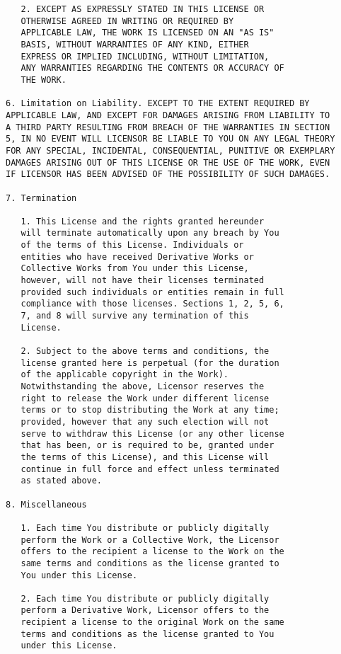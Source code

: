 \begin{verbatim}
   2. EXCEPT AS EXPRESSLY STATED IN THIS LICENSE OR
   OTHERWISE AGREED IN WRITING OR REQUIRED BY
   APPLICABLE LAW, THE WORK IS LICENSED ON AN "AS IS"
   BASIS, WITHOUT WARRANTIES OF ANY KIND, EITHER
   EXPRESS OR IMPLIED INCLUDING, WITHOUT LIMITATION,
   ANY WARRANTIES REGARDING THE CONTENTS OR ACCURACY OF
   THE WORK.

6. Limitation on Liability. EXCEPT TO THE EXTENT REQUIRED BY
APPLICABLE LAW, AND EXCEPT FOR DAMAGES ARISING FROM LIABILITY TO
A THIRD PARTY RESULTING FROM BREACH OF THE WARRANTIES IN SECTION
5, IN NO EVENT WILL LICENSOR BE LIABLE TO YOU ON ANY LEGAL THEORY
FOR ANY SPECIAL, INCIDENTAL, CONSEQUENTIAL, PUNITIVE OR EXEMPLARY
DAMAGES ARISING OUT OF THIS LICENSE OR THE USE OF THE WORK, EVEN
IF LICENSOR HAS BEEN ADVISED OF THE POSSIBILITY OF SUCH DAMAGES.

7. Termination

   1. This License and the rights granted hereunder
   will terminate automatically upon any breach by You
   of the terms of this License. Individuals or
   entities who have received Derivative Works or
   Collective Works from You under this License,
   however, will not have their licenses terminated
   provided such individuals or entities remain in full
   compliance with those licenses. Sections 1, 2, 5, 6,
   7, and 8 will survive any termination of this
   License.

   2. Subject to the above terms and conditions, the
   license granted here is perpetual (for the duration
   of the applicable copyright in the Work).
   Notwithstanding the above, Licensor reserves the
   right to release the Work under different license
   terms or to stop distributing the Work at any time;
   provided, however that any such election will not
   serve to withdraw this License (or any other license
   that has been, or is required to be, granted under
   the terms of this License), and this License will
   continue in full force and effect unless terminated
   as stated above.

8. Miscellaneous

   1. Each time You distribute or publicly digitally
   perform the Work or a Collective Work, the Licensor
   offers to the recipient a license to the Work on the
   same terms and conditions as the license granted to
   You under this License.

   2. Each time You distribute or publicly digitally
   perform a Derivative Work, Licensor offers to the
   recipient a license to the original Work on the same
   terms and conditions as the license granted to You
   under this License.


\end{verbatim}
